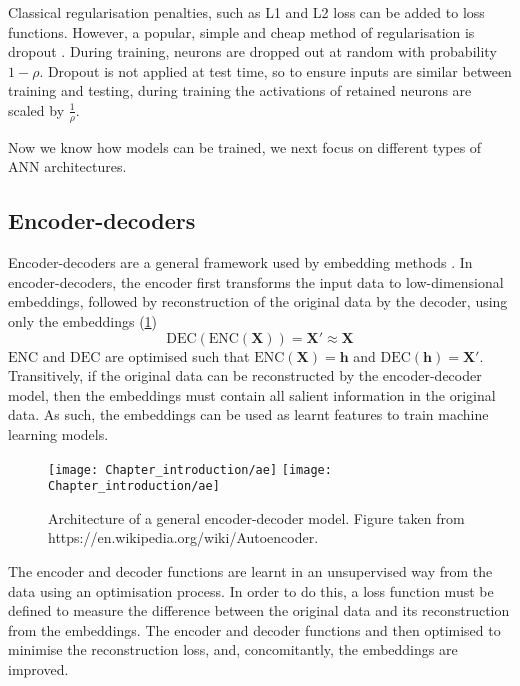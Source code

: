 Classical regularisation penalties, such as L1 and L2 loss can be added to loss functions. However, a popular, simple and cheap method of regularisation is dropout \cite{Srivastava2014}. During training, neurons are dropped out at random with probability $1-\rho$. Dropout is not applied at test time, so to ensure inputs are similar between training and testing, during training the activations of retained neurons are scaled by $\frac{1}{\rho}$.

Now we know how models can be trained, we next focus on different types of ANN architectures.

\subsection{Encoder-decoders}
\label{sec:intro-encoder-decoder}

Encoder-decoders are a general framework used by embedding methods \cite{Hamilton2017}. In encoder-decoders, the encoder first transforms the input data to low-dimensional embeddings, followed by reconstruction of the original data by the decoder, using only the embeddings (\ref{fig:ae})
\[
\text{DEC}(\text{ENC}(\mathbf{X})) = \mathbf{X'} \approx \mathbf{X}
\]
$\text{ENC}$ and $\text{DEC}$ are optimised such that $\text{ENC}(\mathbf{X}) = \mathbf{h}$ and $\text{DEC}(\mathbf{h}) = \mathbf{X'}$. Transitively, if the original data can be reconstructed by the encoder-decoder model, then the embeddings must contain all salient information in the original data. As such, the embeddings can be used as learnt features to train machine learning models.

\begin{figure}[!hbt]
    \centering
    \ifredact
        \texttt{[image: Chapter\_introduction/ae]}
    \else
        \texttt{[image: Chapter\_introduction/ae]}
    \fi
    \caption{%
        Architecture of a general encoder-decoder model.
        Figure taken from https://en.wikipedia.org/wiki/Autoencoder.
    }
    \label{fig:ae}
\end{figure}

The encoder and decoder functions are learnt in an unsupervised way from the data using an optimisation process. In order to do this, a loss function must be defined to measure the difference between the original data and its reconstruction from the embeddings. The encoder and decoder functions and then optimised to minimise the reconstruction loss, and, concomitantly, the embeddings are improved.

